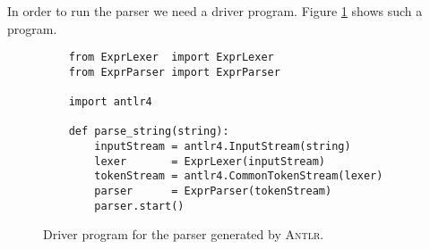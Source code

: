 In order to run the parser we need a driver program.  Figure \ref{fig:PureParser.ipynb} shows such a program.

\begin{figure}[!ht]
\centering
\begin{verbatim}
    from ExprLexer  import ExprLexer
    from ExprParser import ExprParser
    
    import antlr4
    
    def parse_string(string): 
        inputStream = antlr4.InputStream(string)
        lexer       = ExprLexer(inputStream)
        tokenStream = antlr4.CommonTokenStream(lexer)
        parser      = ExprParser(tokenStream)
        parser.start()
\end{verbatim}
\vspace*{-0.3cm}
\caption{Driver program for the parser generated by \textsc{Antlr}.}
\label{fig:PureParser.ipynb}
\end{figure}

